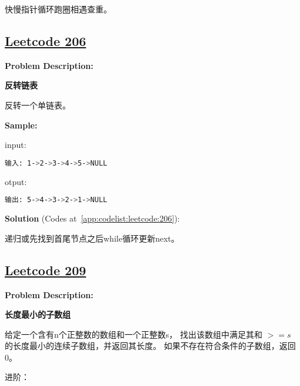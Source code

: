快慢指针循环跑圈相遇查重。\par



\subsection{\href{https://leetcode-cn.com/}{Leetcode 206}}\label{app:problemlist:leetcode:206}

\textbf{Problem Description:}\par

\textbf{反转链表}\par

反转一个单链表。\par


\textbf{Sample:}\par

input:\par

\begin{lstlisting}[language=bash]
输入: 1->2->3->4->5->NULL
\end{lstlisting}

otput:\par

\begin{lstlisting}[language=bash]
输出: 5->4->3->2->1->NULL
\end{lstlisting}

\textbf{Solution }(Codes at~\ref{app:codelist:leetcode:206}):\par

递归或先找到首尾节点之后while循环更新next。\par



\subsection{\href{https://leetcode-cn.com/}{Leetcode 209}}\label{app:problemlist:leetcode:209}

\textbf{Problem Description:}\par

\textbf{长度最小的子数组}\par

给定一个含有n个正整数的数组和一个正整数s，
找出该数组中满足其和 $ >= s $ 的长度最小的连续子数组，并返回其长度。
如果不存在符合条件的子数组，返回 0。\par

进阶：\par

